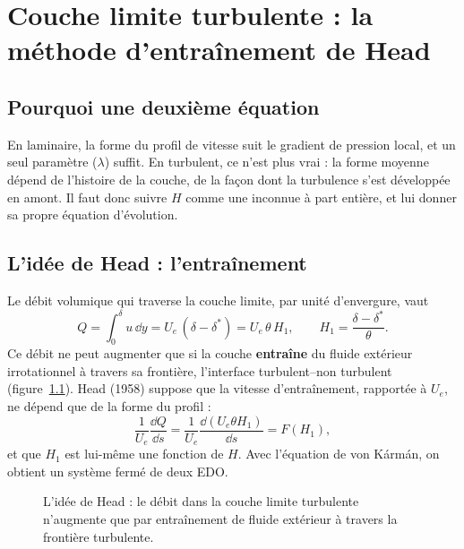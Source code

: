 \chapter{Couche limite turbulente : la méthode d'entraînement de Head}\label{ch:head}

\section{Pourquoi une deuxième équation}
En laminaire, la forme du profil de vitesse suit le gradient de pression local, et un seul paramètre ($\lambda$) suffit. En turbulent, ce n'est plus vrai : la forme moyenne dépend de l'histoire de la couche, de la façon dont la turbulence s'est développée en amont. Il faut donc suivre $H$ comme une inconnue à part entière, et lui donner sa propre équation d'évolution.

\section{L'idée de Head : l'entraînement}
Le débit volumique qui traverse la couche limite, par unité d'envergure, vaut
\[
Q=\int_0^\delta u\,\dd y=U_e\,(\delta-\delta^*)=U_e\,\theta\,H_1,\qquad H_1=\frac{\delta-\delta^*}{\theta}.
\]
Ce débit ne peut augmenter que si la couche \textbf{entraîne} du fluide extérieur irrotationnel à travers sa frontière, l'interface turbulent--non turbulent (figure~\ref{fig:entrainement}). Head (1958) suppose que la vitesse d'entraînement, rapportée à $U_e$, ne dépend que de la forme du profil :
\[
\frac{1}{U_e}\frac{\dd Q}{\dd s}=\frac{1}{U_e}\frac{\dd(U_e\theta H_1)}{\dd s}=F(H_1),
\]
et que $H_1$ est lui-même une fonction de $H$. Avec l'équation de von Kármán, on obtient un système fermé de deux EDO.

\begin{figure}[htbp]
\centering
{}
\caption{L'idée de Head : le débit dans la couche limite turbulente n'augmente que par entraînement de fluide extérieur à travers la frontière turbulente.}\label{fig:entrainement}
\end{figure}

